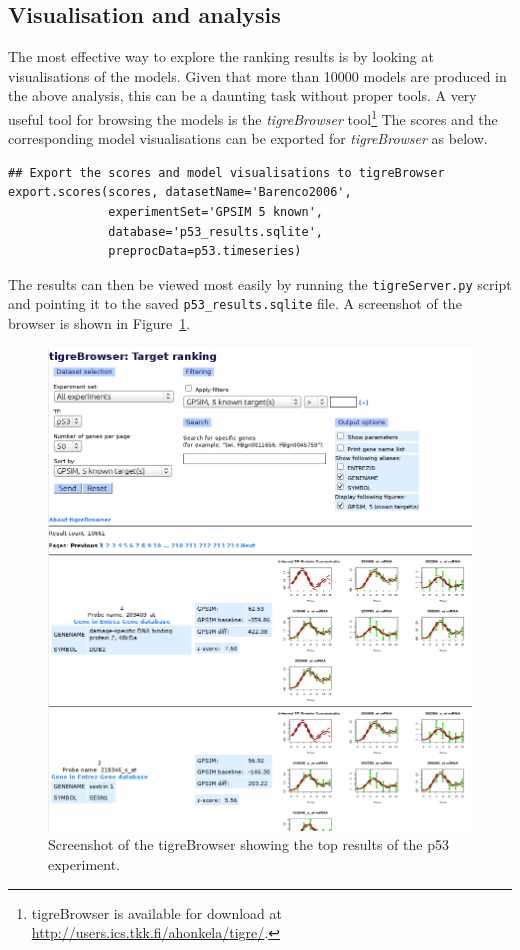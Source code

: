 \documentclass[11pt]{article}
\begin{document}
\subsection{Visualisation and analysis}

The most effective way to explore the ranking results is by looking at
visualisations of the models.  Given that more than 10000 models are produced in
the above analysis, this can be a daunting task without proper tools.
A very useful tool for browsing the models is the \emph{tigreBrowser}
tool\footnote{tigreBrowser is available for download at
  \url{http://users.ics.tkk.fi/ahonkela/tigre/}.}  The scores and the
corresponding model visualisations can be exported for
\emph{tigreBrowser} as below.

\begin{lstlisting}[frame=single]
## Export the scores and model visualisations to tigreBrowser
export.scores(scores, datasetName='Barenco2006',
              experimentSet='GPSIM 5 known',
              database='p53_results.sqlite',
              preprocData=p53.timeseries)
\end{lstlisting}

The results can then be viewed most easily by running the
\texttt{tigreServer.py} script and pointing it to the saved
\texttt{p53\_results.sqlite} file.  A screenshot of the
browser is shown in Figure~\ref{fig:browser_screenshot}.

\begin{figure}[htbp]
  \centering
  \includegraphics[width=\textwidth]{browser_screenshot.png}
  \caption{Screenshot of the tigreBrowser showing the top results of the p53 experiment.}
  \label{fig:browser_screenshot}
\end{figure}
\end{document}
